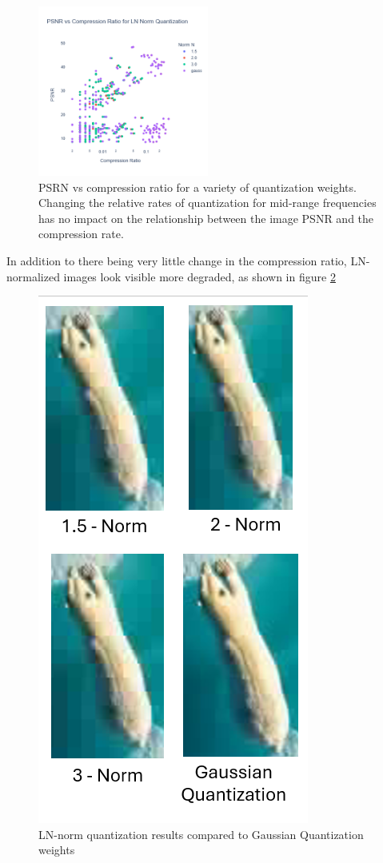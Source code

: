 \begin{figure}
    \includegraphics[width=0.5\textwidth]{assets/PSNR for LN Quantization with gaussian weights.png}
    \caption{PSRN vs compression ratio for a variety of quantization weights. Changing the relative rates of quantization for mid-range frequencies has no impact on the relationship between the image PSNR and the compression rate.}
    \label{fig:LN-norm_quantization_performance}
\end{figure}

In addition to there being very little change in the compression ratio, LN-normalized images look visible more degraded, as shown in figure \ref{fig:quantization_function_comparison}

\begin{figure}
    \includegraphics{assets/Quantization Function Comparison.png}
    \caption{LN-norm quantization results compared to Gaussian Quantization weights}
    \label{fig:quantization_function_comparison}
\end{figure}

